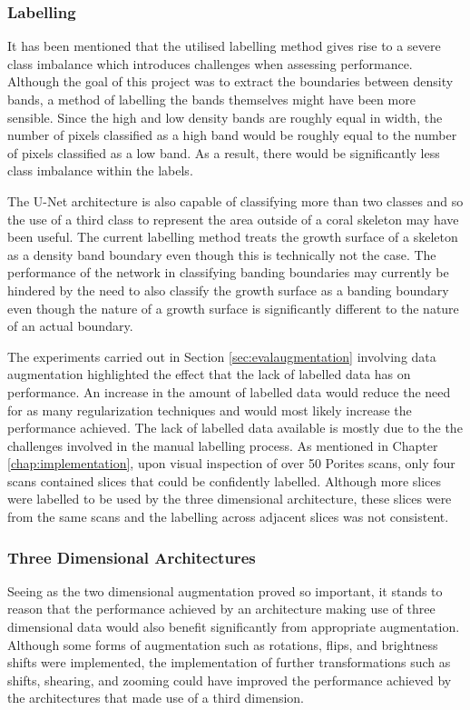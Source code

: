 \subsubsection{Labelling}

It has been mentioned that the utilised labelling method gives rise to a severe class imbalance which introduces challenges when assessing performance. Although the goal of this project was to extract the boundaries between density bands, a method of labelling the bands themselves might have been more sensible. Since the high and low density bands are roughly equal in width, the number of pixels classified as a high band would be roughly equal to the number of pixels classified as a low band. As a result, there would be significantly less class imbalance within the labels.

The U-Net architecture is also capable of classifying more than two classes and so the use of a third class to represent the area outside of a coral skeleton may have been useful. The current labelling method treats the growth surface of a skeleton as a density band boundary even though this is technically not the case. The performance of the network in classifying banding boundaries may currently be hindered by the need to also classify the growth surface as a banding boundary even though the nature of a growth surface is significantly different to the nature of an actual boundary.

The experiments carried out in Section \ref{sec:evalaugmentation} involving data augmentation highlighted the effect that the lack of labelled data has on performance. An increase in the amount of labelled data would reduce the need for as many regularization techniques and would most likely increase the performance achieved. The lack of labelled data available is mostly due to the the challenges involved in the manual labelling process. As mentioned in Chapter \ref{chap:implementation}, upon visual inspection of over 50 Porites scans, only four scans contained slices that could be confidently labelled. Although more slices were labelled to be used by the three dimensional architecture, these slices were from the same scans and the labelling across adjacent slices was not consistent.

\subsubsection{Three Dimensional Architectures}

Seeing as the two dimensional augmentation proved so important, it stands to reason that the performance achieved by an architecture making use of three dimensional data would also benefit significantly from appropriate augmentation. Although some forms of augmentation such as rotations, flips, and brightness shifts were implemented, the implementation of further transformations such as shifts, shearing, and zooming could have improved the performance achieved by the architectures that made use of a third dimension.

